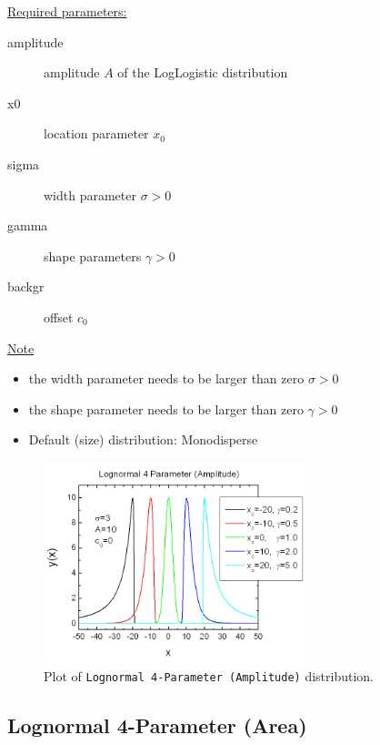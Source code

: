 \underline{Required parameters:}
\begin{description}
    \item[amplitude] amplitude $A$ of the LogLogistic distribution
    \item[x0] location parameter $x_0$
    \item[sigma] width parameter $\sigma > 0$
    \item[gamma] shape parameters $\gamma > 0$
    \item[backgr] offset $c_0$
\end{description}

\underline{Note}
\begin{itemize}
  \item the width parameter needs to be larger than zero $\sigma > 0$
  \item the shape parameter needs to be larger than zero $\gamma > 0$
  \item Default (size) distribution: Monodisperse
\end{itemize}

\begin{figure}[htb]
\begin{center}
\includegraphics[width=0.6824\textwidth]{LogNormal4ParameterAmplitude.png}
\end{center}
\caption{Plot of \texttt{Lognormal 4-Parameter (Amplitude)} distribution.}
\label{fig:LogNormal4ParameterAmplitude}
\end{figure}
\clearpage
\subsection{Lognormal 4-Parameter (Area)} ~\\
\label{sec:LogNormal4ParameterArea}


